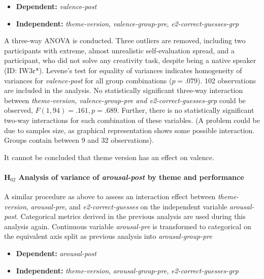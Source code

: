 	\begin{itemize}
		\item \textbf{Dependent:} \textit{valence-post}
		\item \textbf{Independent:} \textit{theme-version}, \textit{valence-group-pre}, \textit{e2-correct-guesses-grp}
	\end{itemize}
	
	A three-way ANOVA is conducted.
	Three outliers are removed, including two participants with extreme, almost unrealistic self-evaluation spread, and a participant, who did not solve any creativity task, despite being a native speaker (ID: IW3r*).
	Levene's test for equality of variances indicates homogeneity of variances for \textit{valence-post} for all group combinations (\(p = .079\)). 
	102 observations are included in the analysis. No statistically significant three-way interaction between \textit{theme-version, valence-group-pre and e2-correct-guesses-grp} could be observed, \(F(1, 94) = .161, p = .689\). Further, there is no statistically significant two-way interactions for each combination of these variables. (A problem could be due to samples size,  as graphical representation shows some possible interaction. Groups contain between 9 and 32 observations).
	
	It cannot be concluded that theme version has an effect on valence.
	
	\paragraph{H$_{02}$ Analysis of variance of \textit{arousal-post} by theme and performance}
	
	A similar procedure as above to assess an interaction effect between \textit{theme-version}, \textit{arousal-pre}, and \textit{e2-correct-guesses} on the independent variable \textit{arousal-post}. Categorical metrics derived in the previous analysis are used during this analysis again. Continuous variable \textit{arousal-pre} is transformed to categorical on the equivalent axis split as previous analysis into \textit{arousal-group-pre}
	
	\begin{itemize}
		\item \textbf{Dependent:} \textit{arousal-post}
		\item \textbf{Independent:} \textit{theme-version}, \textit{arousal-group-pre}, \textit{e2-correct-guesses-grp}
	\end{itemize}
	
